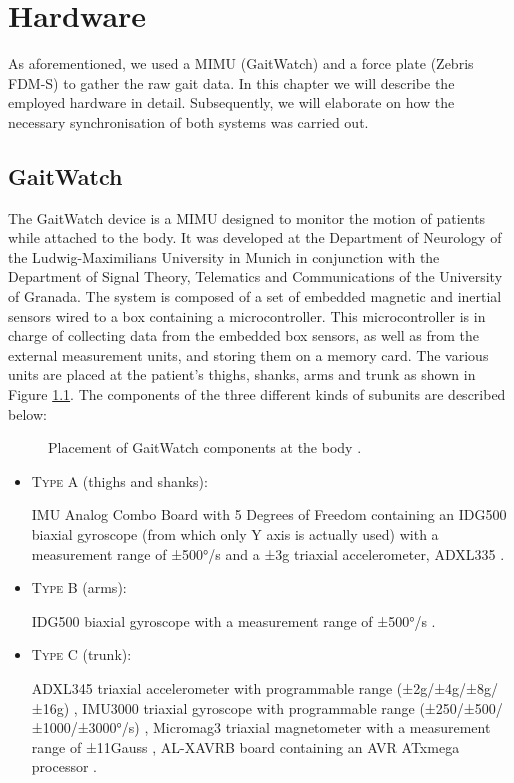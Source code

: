 \chapter{Hardware}
\label{ch:Hardware}

As aforementioned, we used a MIMU (GaitWatch) and a force plate (Zebris FDM-S) to gather the raw gait data. In this chapter we will describe the employed hardware in detail. Subsequently, we will elaborate on how the necessary synchronisation of both systems was carried out.

\section{GaitWatch}

The GaitWatch device is a MIMU designed to monitor the motion of patients while attached to the body. It was developed at the Department of Neurology of the Ludwig-Maximilians University in Munich in conjunction with the Department of Signal Theory, Telematics and Communications of the University of Granada. The system is composed of a set of embedded magnetic and inertial sensors wired to a box containing a microcontroller. This microcontroller is in charge of collecting data from the embedded box sensors, as well as from the external measurement units, and storing them on a memory card. The various units are placed at the patient's thighs, shanks, arms and trunk as shown in Figure \ref{fig:GaitWatch_placement}. The components of the three different kinds of subunits are described below:

\begin{figure}
	\centering
	\caption{Placement of GaitWatch components at the body \cite{olivares_vicente_gaitwatch_2013}.}
	\label{fig:GaitWatch_placement}
\end{figure}

\begin{itemize}

\item \textsc{Type A} (thighs and shanks): 

IMU Analog Combo Board with 5 Degrees of Freedom \cite{IMU5} containing an IDG500 biaxial gyroscope (from which only Y axis is actually used) with a measurement range of ±500°/s \cite{IDG500} and a ±3g triaxial accelerometer, ADXL335 \cite{ADXL335}.

\item \textsc{Type B} (arms):

IDG500 biaxial gyroscope with a measurement range of ±500°/s \cite{IDG500}.

\item \textsc{Type C} (trunk):

ADXL345 triaxial accelerometer with programmable range (±2g/±4g/±8g/±16g) \cite{ADXL345},
IMU3000 triaxial gyroscope with programmable range (±250/±500/±1000/±3000°/s) \cite{IMU3000}, 
Micromag3 triaxial magnetometer with a measurement range of ±11Gauss \cite{MicroMag3}, AL-XAVRB board containing an AVR ATxmega processor \cite{AVRATxmega}.

\end{itemize}


